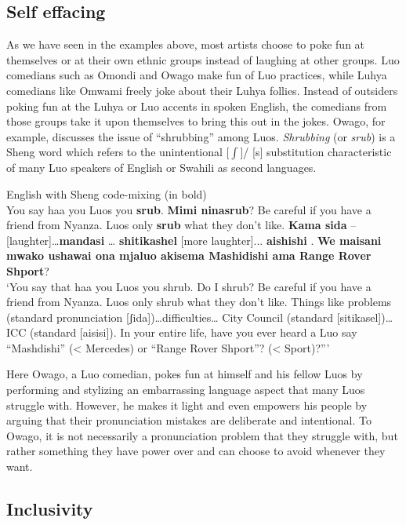 \documentclass[output=paper]{langsci/langscibook}
\begin{document}
\subsection{Self effacing}

   As we have seen in the examples above, most artists choose to poke fun at themselves or at their own ethnic groups instead of laughing at other groups. Luo comedians such as Omondi and Owago make fun of Luo practices, while Luhya comedians like Omwami freely joke about their Luhya follies. Instead of outsiders poking fun at the Luhya or Luo accents in spoken English, the comedians from those groups take it upon themselves to bring this out in the jokes. Owago, for example, discusses the issue of “shrubbing” among Luos. \textit{Shrubbing} (or \textit{srub}) is a Sheng word which refers to the unintentional [${\int}$]/ [s] substitution characteristic of many Luo speakers of English or Swahili as second languages.

\ea
{English with Sheng code-mixing (in bold)}\\
 You say haa you Luos you \textbf{srub}. \textbf{Mimi ninasrub}? Be careful if you have a friend from Nyanza. Luos only \textbf{srub} what they don’t like. \textbf{Kama sida} –\textup{[laughter]}…\textbf{mandasi} … \textbf{shitikashel} \textup{[more laughter]}... \textbf{aishishi} . \textbf{We maisani mwako ushawai ona mjaluo akisema Mashidishi ama Range Rover Shport}?\\
‘You say that haa you Luos you shrub. Do I shrub? Be careful if you have a friend from Nyanza. Luos only shrub what they don’t like. Things like problems (standard pronunciation [ʃida])…difficulties… City Council (standard [sitikasel])… ICC (standard [aisisi]). In your entire life, have you ever heard a Luo say “Mashdishi” ({\textless} Mercedes) or “Range Rover Shport”? ({\textless} Sport)?”’ \citep{Churchill2013c}
\z

  Here Owago, a Luo comedian, pokes fun at himself and his fellow Luos by performing and stylizing an embarrassing language aspect that many Luos struggle with. However, he makes it light and even empowers his people by arguing that their pronunciation mistakes are deliberate and intentional. To Owago, it is not necessarily a pronunciation problem that they struggle with, but rather something they have power over and can choose to avoid whenever they want.

\subsection{Inclusivity }
\end{document}
